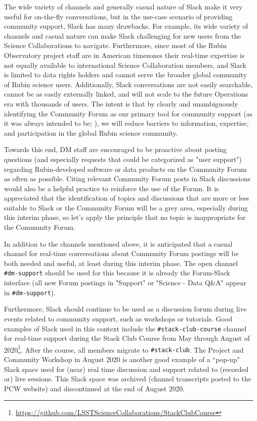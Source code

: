 \documentclass[DM,lsstdraft,authoryear,toc]{lsstdoc}
\begin{document}
The wide variety of channels and generally casual nature of Slack make it very useful for on-the-fly conversations, but in the use-case scenario of providing community support, Slack has many drawbacks.
For example, its wide variety of channels and casual nature can make Slack challenging for new users from the Science Collaborations to navigate.
Furthermore, since most of the Rubin Observatory project staff are in American timezones their real-time expertise is not equally available to international Science Collaboration members, and Slack is limited to data rights holders and cannot serve the broader global community of Rubin science users.
Additionally, Slack conversations are not easily searchable, cannot be as easily externally linked, and will not scale to the future Operations era with thousands of users.
The intent is that by clearly and unambiguously identifying the Community Forum as our primary tool for community support (as it was always intended to be; ), we will reduce barriers to information, expertise, and participation in the global Rubin science community.

Towards this end, DM staff are encouraged to be proactive about posting questions (and especially requests that could be categorized as "user support") regarding Rubin-developed software or data products on the Community Forum as often as possible.
Citing relevant Community Forum posts in Slack discussions would also be a helpful practice to reinforce the use of the Forum.
It is appreciated that the identification of topics and discussions that are more or less suitable to Slack or the Community Forum will be a grey area, especially during this interim phase, so let's apply the principle that no topic is inappropriate for the Community Forum.

In addition to the channels mentioned above, it is anticipated that a casual channel for real-time conversations about Community Forum postings will be both needed and useful, at least during this interim phase.
The open channel {\tt \#dm-support} should be used for this because it is already the Forum-Slack interface (all new Forum postings in "Support" or "Science - Data Q\&A" appear in {\tt \#dm-support}).

Furthermore, Slack should continue to be used as a discussion forum during live events related to community support, such as workshops or tutorials.
Good examples of Slack used in this context include the {\tt \#stack-club-course} channel for real-time support during the Stack Club Course from May through August of 2020\footnote{\url{https://github.com/LSSTScienceCollaborations/StackClubCourse}}.
After the course, all members migrate to {\tt \#stack-club}.
The Project and Community Workshop in August 2020 is another good example of a ``pop-up" Slack space used for (near) real time discussion and support related to (recorded or) live sessions.
This Slack space was archived (channel transcripts posted to the PCW website) and discontinued at the end of August 2020.
\end{document}
